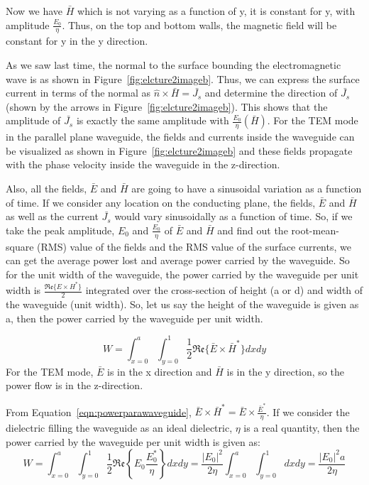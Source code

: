 Now we have $\bar{H}$ which is not varying as a function of y, it is constant for y, with amplitude $\frac{E_0}{\eta}$. Thus, on the top and bottom walls, the magnetic field will be constant for y in the y direction.

As we saw last time, the normal to the surface bounding the electromagnetic wave is as shown in Figure~\ref{fig:elcture2imageb}. Thus, we can express the surface current in terms of the normal as $\hat{n}\times\bar{H}=\bar{J_s}$ and determine the direction of $\bar{J_s}$ (shown by the arrows in Figure~\ref{fig:elcture2imageb}). This shows that the amplitude of $\bar{J_s}$ is exactly the same amplitude with $\frac{E_0}{\eta}(\bar{H})$. For the TEM mode in the parallel plane waveguide, the fields and currents inside the waveguide can be visualized as shown in Figure~\ref{fig:elcture2imageb} and these fields propagate with the phase velocity inside the waveguide in the z-direction.

Also, all the fields, $\bar{E}$ and $\bar{H}$ are going to have a sinusoidal variation as a function of time. If we consider any location on the conducting plane, the fields, $\bar{E}$ and $\bar{H}$ as well as the current $\bar{J_s}$ would vary sinusoidally as a function of time. So, if we take the peak amplitude, $E_0$ and $\frac{E_0}{\eta}$ of $\bar{E}$ and $\bar{H}$ and find out the root-mean-square (RMS) value of the fields and the RMS value of the surface currents, we can get the average power lost and average power carried by the waveguide. So for the unit width of the waveguide, the power carried by the waveguide per unit width is $\frac{\mathfrak{Re}\lbrace E \times H^*\rbrace}{2}$ integrated over the cross-section of height (a or d) and width of the waveguide (unit width). So, let us say the height of the waveguide is given as a, then the power carried by the waveguide per unit width.

\begin{equation}
W=\int_{x=0}^{a}\int_{y=0}^{1} \frac{1}{2}\mathfrak{Re}\lbrace\bar{E} \times \bar{H}^\ast\rbrace dxdy
\label{eqn:powerparawaveguide}	
\end{equation}
For the TEM mode, $\bar{E}$ is in the x direction and $\bar{H}$ is in the y direction, so the power flow is in the z-direction.

From Equation~\eqref{eqn:powerparawaveguide}, $\bar{E} \times \bar{H}^\ast = \bar{E} \times \frac{\bar{E}^\ast}{\eta}$. If we consider the dielectric filling the waveguide as an ideal dielectric, $\eta$ is a real quantity, then the power carried by the waveguide per unit width is given as:
\begin{dmath}
W = \int_{x=0}^{a}\int_{y=0}^{1}\frac{1}{2}\mathfrak{Re}\left\lbrace E_0 \frac{E_0^\ast}{\eta}\right\rbrace dxdy
= \frac{\left|E_{0}\right|^2}{2\eta}\int_{x=0}^{a}\int_{y=0}^{1}dxdy 
= \frac{|E_0|^2a}{2\eta}
\label{eqn:powercarriedperunitwidth}
\end{dmath}

